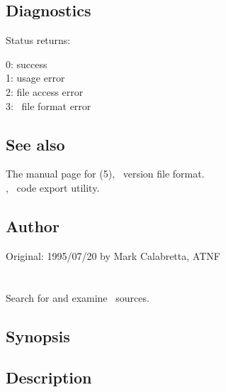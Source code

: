 \subsection*{Diagnostics}
 
Status returns:
\begin{status}
   0: success\\
   1: usage error\\
   2: file access error\\
   3: \rcs\ file format error
\end{status}
 
\subsection*{See also}
 
The manual page for (5), \rcs\ version file format.\\
, \aipspp\ code export utility.\\

 
\subsection*{Author}
 
Original: 1995/07/20 by Mark Calabretta, ATNF


\newpage
\section{}
\label{squiz}

Search for and examine \aipspp\ sources.

\subsection*{Synopsis}

\begin{synopsis}
\end{synopsis}

\subsection*{Description}

